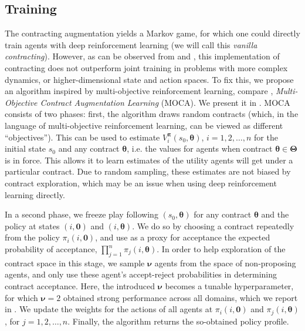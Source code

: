 \documentclass[referee,sn-basic]{sn-jnl}
\theoremstyle{thmstyleone}%
\theoremstyle{thmstyletwo}%
\theoremstyle{thmstylethree}%
\begin{document}
\subsection{Training}

The contracting augmentation yields a Markov game, for which one could directly train agents with deep reinforcement learning (we will call this \emph{vanilla contracting}). However, as can be observed from  and , this implementation of contracting does not outperform joint training in problems with more complex dynamics, or higher-dimensional state and action spaces. To fix this, we propose an algorithm inspired by multi-objective reinforcement learning, compare \cite{andrychowicz_hindsight_2017}, \emph{Multi-Objective Contract Augmentation Learning} (MOCA). We present it in . MOCA consists of two phases: first, the algorithm draws random contracts (which, in the language of multi-objective reinforcement learning, can be viewed as different \enquote{objectives}). This can be used to estimate $V^{\boldsymbol \pi}_i (s_0, \boldsymbol\theta)$, $i=1, 2, \dots, n$ for the initial state $s_0$ and any contract $\boldsymbol\theta$, i.e. the values for agents when contract $\boldsymbol\theta \in \boldsymbol\Theta$ is in force. This allows it to learn  estimates of the utility agents will get under a particular contract. Due to random sampling, these estimates are not biased by contract exploration, which may be an issue when using deep reinforcement learning directly.

In a second phase, we freeze play following $(s_0, \boldsymbol\theta)$ for any contract $\boldsymbol\theta$ and the policy at states $(i, \boldsymbol 0)$ and $(i, \boldsymbol\theta)$. We do so by choosing a contract repeatedly from the policy $\pi_i(i, \boldsymbol 0)$, and use as a proxy for acceptance the expected probability of acceptance, $\prod_{j=1}^n \pi_j(i, \boldsymbol\theta)$. In order to help exploration of the contract space in this stage, we sample $\boldsymbol \nu$ agents from the space of non-proposing agents, and only use these agent's accept-reject probabilities in determining contract acceptance. Here, the introduced $\boldsymbol \nu$ becomes a tunable hyperparameter, for which $\boldsymbol \nu = 2$ obtained strong performance across all domains, which we report in . We update the weights for the actions of all agents at $\pi_i(i, \boldsymbol 0)$ and $\pi_j (i, \boldsymbol\theta)$, for $j=1, 2, \dots, n$. Finally, the algorithm returns the so-obtained policy profile. 
\end{document}
